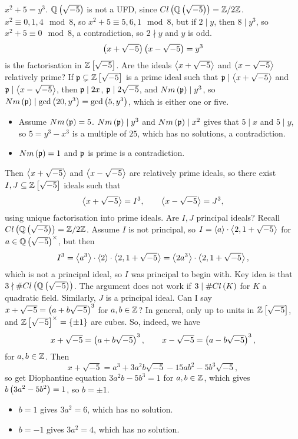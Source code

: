 \begin{example*}
$ x^2 + 5 = y^3 $. $ \mathbb{Q}\left( \sqrt{-5} \right) $ is not a UFD, since $ Cl\left( \mathbb{Q}\left( \sqrt{-5} \right) \right) = \mathbb{Z} / 2\mathbb{Z} $. $ x^2 \equiv 0, 1, 4 \mod 8 $, so $ x^2 + 5 \equiv 5, 6, 1 \mod 8 $, but if $ 2 \mid y $, then $ 8 \mid y^3 $, so $ x^2 + 5 \equiv 0 \mod 8 $, a contradiction, so $ 2 \nmid y $ and $ y $ is odd.
$$ \left( x + \sqrt{-5} \right)\left( x - \sqrt{-5} \right) = y^3 $$
is the factorisation in $ \mathbb{Z}\left[ \sqrt{-5} \right] $. Are the ideals $ \left\langle x + \sqrt{-5} \right\rangle $ and $ \left\langle x - \sqrt{-5} \right\rangle $ relatively prime? If $ \mathfrak{p} \subsetneq \mathbb{Z}\left[ \sqrt{-5} \right] $ is a prime ideal such that $ \mathfrak{p} \mid \left\langle x + \sqrt{-5} \right\rangle $ and $ \mathfrak{p} \mid \left\langle x - \sqrt{-5} \right\rangle $, then $ \mathfrak{p} \mid 2x $, $ \mathfrak{p} \mid 2\sqrt{-5} $, and $ Nm\left( \mathfrak{p} \right) \mid y^3 $, so $ Nm\left( \mathfrak{p} \right) \mid \gcd\left( 20, y^3 \right) = \gcd\left( 5, y^3 \right) $, which is either one or five.
\begin{itemize}
\item Assume $ Nm\left( \mathfrak{p} \right) = 5 $. $ Nm\left( \mathfrak{p} \right) \mid y^3 $ and $ Nm\left( \mathfrak{p} \right) \mid x^2 $ gives that $ 5 \mid x $ and $ 5 \mid y $, so $ 5 = y^3 - x^3 $ is a multiple of $ 25 $, which has no solutions, a contradiction.
\item $ Nm\left( \mathfrak{p} \right) = 1 $ and $ \mathfrak{p} $ is prime is a contradiction.
\end{itemize}
Then $ \left\langle x + \sqrt{-5} \right\rangle $ and $ \left\langle x - \sqrt{-5} \right\rangle $ are relatively prime ideals, so there exist $ I, J \subseteq \mathbb{Z}\left[ \sqrt{-5} \right] $ ideals such that
$$ \left\langle x + \sqrt{-5} \right\rangle = I^3, \qquad \left\langle x - \sqrt{-5} \right\rangle = J^3, $$
using unique factorisation into prime ideals. Are $ I, J $ principal ideals? Recall $ Cl\left( \mathbb{Q}\left( \sqrt{-5} \right) \right) = \mathbb{Z} / 2\mathbb{Z} $. Assume $ I $ is not principal, so $ I = \left\langle a \right\rangle \cdot \left\langle 2, 1 + \sqrt{-5} \right\rangle $ for $ a \in \mathbb{Q}\left( \sqrt{-5} \right)^\times $, but then
$$ I^3 = \left\langle a^3 \right\rangle \cdot \left\langle 2 \right\rangle \cdot \left\langle 2, 1 + \sqrt{-5} \right\rangle = \left\langle 2a^3 \right\rangle \cdot \left\langle 2, 1 + \sqrt{-5} \right\rangle, $$
which is not a principal ideal, so $ I $ was principal to begin with. Key idea is that $ 3 \nmid \#Cl\left( \mathbb{Q}\left( \sqrt{-5} \right) \right) $. The argument does not work if $ 3 \mid \#Cl\left( K \right) $ for $ K $ a quadratic field. Similarly, $ J $ is a principal ideal. Can I say $ x + \sqrt{-5} = \left( a + b\sqrt{-5} \right)^3 $ for $ a, b \in \mathbb{Z} $? In general, only up to units in $ \mathbb{Z}\left[ \sqrt{-5} \right] $, and $ \mathbb{Z}\left[ \sqrt{-5} \right]^\times = \left\{ \pm 1 \right\} $ are cubes. So, indeed, we have
$$ x + \sqrt{-5} = \left( a + b\sqrt{-5} \right)^3, \qquad x - \sqrt{-5} = \left( a - b\sqrt{-5} \right)^3, $$
for $ a, b \in \mathbb{Z} $. Then
$$ x + \sqrt{-5} = a^3 + 3a^2b\sqrt{-5} - 15ab^2 - 5b^3\sqrt{-5}, $$
so get Diophantine equation $ 3a^2b - 5b^3 = 1 $ for $ a, b \in \mathbb{Z} $, which gives $ b\left( 3a^2 - 5b^2 \right) = 1 $, so $ b = \pm 1 $.
\begin{itemize}
\item $ b = 1 $ gives $ 3a^2 = 6 $, which has no solution.
\item $ b = -1 $ gives $ 3a^2 = 4 $, which has no solution.
\end{itemize}
\end{example*}

